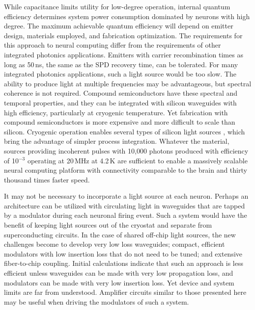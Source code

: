 \documentclass[twocolumn]{article}
\begin{document}
While capacitance limits utility for low-degree operation, internal quantum efficiency determines system power consumption dominated by neurons with high degree. The maximum achievable quantum efficiency will depend on emitter design, materials employed, and fabrication optimization. The requirements for this approach to neural computing differ from the requirements of other integrated photonics applications. Emitters with carrier recombination times as long as 50\,ns, the same as the SPD recovery time, can be tolerated. For many integrated photonics applications, such a light source would be too slow. The ability to produce light at multiple frequencies may be advantageous, but spectral coherence is not required. Compound semiconductors have these spectral and temporal properties, and they can be integrated with silicon waveguides \cite{doro2017} with high efficiency, particularly at cryogenic temperature. Yet fabrication with compound semiconductors is more expensive and more difficult to scale than silicon. Cryogenic operation enables several types of silicon light sources \cite{da1989,shxu2007,buch2017}, which bring the advantage of simpler process integration. Whatever the material, sources providing incoherent pulses with 10,000 photons produced with efficiency of 10$^{-3}$ operating at 20\,MHz at 4.2\,K are sufficient to enable a massively scalable neural computing platform with connectivity comparable to the brain and thirty thousand times faster speed.

It may not be necessary to incorporate a light source at each neuron. Perhaps an architecture can be utilized with circulating light in waveguides that are tapped by a modulator during each neuronal firing event. Such a system would have the benefit of keeping light sources out of the cryostat and separate from superconducting circuits. In the case of shared off-chip light sources, the new challenges become to develop very low loss waveguides; compact, efficient modulators with low insertion loss that do not need to be tuned; and extensive fiber-to-chip coupling. Initial calculations indicate that such an approach is less efficient unless waveguides can be made with very low propagation loss, and modulators can be made with very low insertion loss. Yet device and system limits are far from understood. Amplifier circuits similar to those presented here may be useful when driving the modulators of such a system.
\end{document}

